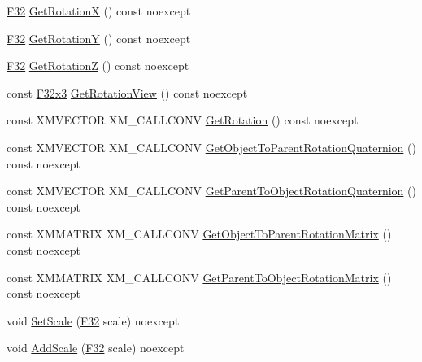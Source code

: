 \begin{DoxyCompactItemize}
\item 
\mbox{\hyperlink{namespacemage_aa97e833b45f06d60a0a9c4fc22ae02c0}{F32}} \mbox{\hyperlink{classmage_1_1_s1_e_t_transform3_d_a6edf045f2e969bc325b52dd3027465e7}{Get\+RotationX}} () const noexcept
\item 
\mbox{\hyperlink{namespacemage_aa97e833b45f06d60a0a9c4fc22ae02c0}{F32}} \mbox{\hyperlink{classmage_1_1_s1_e_t_transform3_d_aea679972dab8ec6a3e02d73ec5198ffd}{Get\+RotationY}} () const noexcept
\item 
\mbox{\hyperlink{namespacemage_aa97e833b45f06d60a0a9c4fc22ae02c0}{F32}} \mbox{\hyperlink{classmage_1_1_s1_e_t_transform3_d_a1ed23da5316deb3bdb5704b07c6863f2}{Get\+RotationZ}} () const noexcept
\item 
const \mbox{\hyperlink{namespacemage_a1e3c7a882af461f161caa1cbddaf1fa2}{F32x3}} \mbox{\hyperlink{classmage_1_1_s1_e_t_transform3_d_a54901eabed50d96af9705580557d25ab}{Get\+Rotation\+View}} () const noexcept
\item 
const X\+M\+V\+E\+C\+T\+OR X\+M\+\_\+\+C\+A\+L\+L\+C\+O\+NV \mbox{\hyperlink{classmage_1_1_s1_e_t_transform3_d_a14a993c146cdfe6ebb5db8bf1eedef23}{Get\+Rotation}} () const noexcept
\item 
const X\+M\+V\+E\+C\+T\+OR X\+M\+\_\+\+C\+A\+L\+L\+C\+O\+NV \mbox{\hyperlink{classmage_1_1_s1_e_t_transform3_d_a07af1c560257a9cdf84ede7e540bed38}{Get\+Object\+To\+Parent\+Rotation\+Quaternion}} () const noexcept
\item 
const X\+M\+V\+E\+C\+T\+OR X\+M\+\_\+\+C\+A\+L\+L\+C\+O\+NV \mbox{\hyperlink{classmage_1_1_s1_e_t_transform3_d_a52dfb00eecfe8ae6f6f672b6a5822952}{Get\+Parent\+To\+Object\+Rotation\+Quaternion}} () const noexcept
\item 
const X\+M\+M\+A\+T\+R\+IX X\+M\+\_\+\+C\+A\+L\+L\+C\+O\+NV \mbox{\hyperlink{classmage_1_1_s1_e_t_transform3_d_ae79d748433cc98f46e4bc0442a862cab}{Get\+Object\+To\+Parent\+Rotation\+Matrix}} () const noexcept
\item 
const X\+M\+M\+A\+T\+R\+IX X\+M\+\_\+\+C\+A\+L\+L\+C\+O\+NV \mbox{\hyperlink{classmage_1_1_s1_e_t_transform3_d_ac794348bd010547cdb3c6f108812d0e9}{Get\+Parent\+To\+Object\+Rotation\+Matrix}} () const noexcept
\item 
void \mbox{\hyperlink{classmage_1_1_s1_e_t_transform3_d_a5ae15331e6896a1192ebcbaa567fb9ef}{Set\+Scale}} (\mbox{\hyperlink{namespacemage_aa97e833b45f06d60a0a9c4fc22ae02c0}{F32}} scale) noexcept
\item 
void \mbox{\hyperlink{classmage_1_1_s1_e_t_transform3_d_a79b9a7859676dfbb2bed618157938bf3}{Add\+Scale}} (\mbox{\hyperlink{namespacemage_aa97e833b45f06d60a0a9c4fc22ae02c0}{F32}} scale) noexcept

\end{DoxyCompactItemize}
